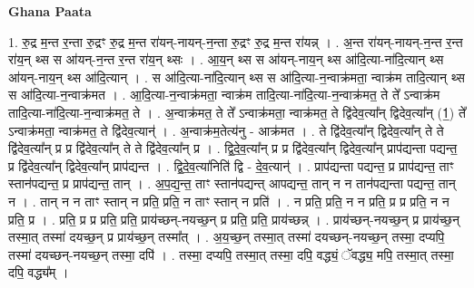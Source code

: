 \documentclass[17pt]{extarticle}
\begin{document}
\textbf{Ghana Paata } \newline

1. रु॒द्र म॒न्त र॒न्ता रु॒द्रꣳ रु॒द्र म॒न्त रा॑यन्-नायन्-न॒न्ता रु॒द्रꣳ रु॒द्र म॒न्त रा॑यन्न् । . अ॒न्त रा॑यन्-नायन्-न॒न्त र॒न्त रा॑य॒न् थ्स स आ॑यन्-न॒न्त र॒न्त रा॑य॒न् थ्सः । . आ॒य॒न् थ्स स आ॑यन्-नाय॒न् थ्स आ॑दि॒त्या-ना॑दि॒त्यान् थ्स आ॑यन्-नाय॒न् थ्स आ॑दि॒त्यान् । . स आ॑दि॒त्या-ना॑दि॒त्यान् थ्स स आ॑दि॒त्या-न॒न्वाक्र॑मता॒ न्वाक्र॑म तादि॒त्यान् थ्स स आ॑दि॒त्या-न॒न्वाक्र॑मत । . आ॒दि॒त्या-न॒न्वाक्र॑मता॒ न्वाक्र॑म तादि॒त्या-ना॑दि॒त्या-न॒न्वाक्र॑मत॒ ते ते᳚ ऽन्वाक्र॑म तादि॒त्या-ना॑दि॒त्या-न॒न्वाक्र॑मत॒ ते । . अ॒न्वाक्र॑मत॒ ते ते᳚ ऽन्वाक्र॑मता॒ न्वाक्र॑मत॒ ते द्वि॑देव॒त्या᳚न् द्विदेव॒त्या᳚न् (1॒) ते᳚ ऽन्वाक्र॑मता॒ न्वाक्र॑मत॒ ते द्वि॑देव॒त्यान्॑ । . अ॒न्वाक्र॑म॒तेत्य॑नु - आक्र॑मत । . ते द्वि॑देव॒त्या᳚न् द्विदेव॒त्या᳚न् ते ते द्वि॑देव॒त्या᳚न् प्र प्र द्वि॑देव॒त्या᳚न् ते ते द्वि॑देव॒त्या᳚न् प्र । . द्वि॒दे॒व॒त्या᳚न् प्र प्र द्वि॑देव॒त्या᳚न् द्विदेव॒त्या᳚न् प्राप॑द्यन्ता पद्यन्त॒ प्र द्वि॑देव॒त्या᳚न् द्विदेव॒त्या᳚न् प्राप॑द्यन्त । . द्वि॒दे॒व॒त्या॑निति॑ द्वि - दे॒व॒त्यान्॑ । . प्राप॑द्यन्ता पद्यन्त॒ प्र प्राप॑द्यन्त॒ ताꣳ स्तान॑पद्यन्त॒ प्र प्राप॑द्यन्त॒ तान् । . अ॒प॒द्य॒न्त॒ ताꣳ स्तान॑पद्यन्त् आपद्यन्त॒ तान् न न तान॑पद्यन्ता पद्यन्त॒ तान् न । . तान् न न ताꣳ स्तान् न प्रति॒ प्रति॒ न ताꣳ स्तान् न प्रति॑ । . न प्रति॒ प्रति॒ न न प्रति॒ प्र प्र प्रति॒ न न प्रति॒ प्र । . प्रति॒ प्र प्र प्रति॒ प्रति॒ प्राय॑च्छन्-नयच्छ॒न् प्र प्रति॒ प्रति॒ प्राय॑च्छन्न् । . प्राय॑च्छन्-नयच्छ॒न् प्र प्राय॑च्छ॒न् तस्मा॒त् तस्मा॑ दयच्छ॒न् प्र प्राय॑च्छ॒न् तस्मा᳚त् । . अ॒य॒च्छ॒न् तस्मा॒त् तस्मा॑ दयच्छन्-नयच्छ॒न् तस्मा॒ दप्यपि॒ तस्मा॑ दयच्छन्-नयच्छ॒न् तस्मा॒ दपि॑ । . तस्मा॒ दप्यपि॒ तस्मा॒त् तस्मा॒ दपि॒ वद्ध्यं॒ ॅवद्ध्य॒ मपि॒ तस्मा॒त् तस्मा॒ दपि॒ वद्ध्य᳚म् । \newline
\end{document}
